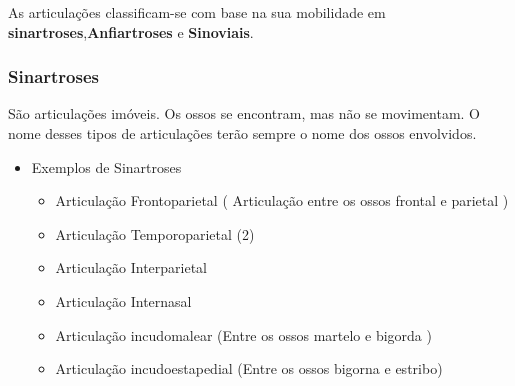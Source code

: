 \documentclass[
]{book}
\providecommand{\tightlist}{%
  \setlength{\itemsep}{0pt}\setlength{\parskip}{0pt}}
\begin{document}
As articulações classificam-se com base na sua mobilidade em \textbf{sinartroses},\textbf{Anfiartroses} e \textbf{Sinoviais}.

\hypertarget{sinartroses}{%
\subsubsection{Sinartroses}\label{sinartroses}}

São articulações imóveis. Os ossos se encontram, mas não se movimentam. O nome desses tipos de articulações terão sempre o nome dos ossos envolvidos.

\begin{itemize}
\tightlist
\item
  Exemplos de Sinartroses

  \begin{itemize}
  \tightlist
  \item
    Articulação Frontoparietal ( Articulação entre os ossos frontal e parietal )
  \item
    Articulação Temporoparietal (2)
  \item
    Articulação Interparietal
  \item
    Articulação Internasal
  \item
    Articulação incudomalear (Entre os ossos martelo e bigorda )
  \item
    Articulação incudoestapedial (Entre os ossos bigorna e estribo)
  \end{itemize}
\end{itemize}
\end{document}
